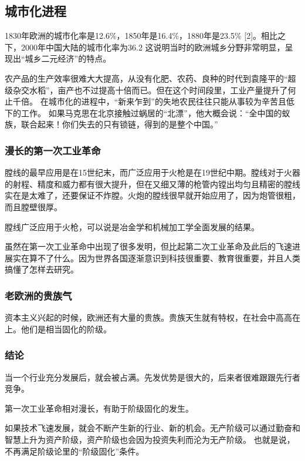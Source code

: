 \subsection{城市化进程}

1830年欧洲的城市化率是12.6\%，1850年是16.4\%，1880年是23.5\% [2]。相比之下，2000年中国大陆的城市化率为36.2%
这说明当时的欧洲城乡分野非常明显，呈现出“城乡二元经济”的特点。

农产品的生产效率很难大大提高，从没有化肥、农药、良种的时代到袁隆平的“超级杂交水稻”，亩产也不过提高十倍而已。但在这个时间段里，工业产量提升了何止千倍。
在城市化的进程中，“新来乍到”的失地农民往往只能从事较为辛苦且低下的工作。
如果马克思在北京接触过蜗居的“北漂”，他大概会说：“全中国的蚁族，联合起来！你们失去的只有锁链，得到的是整个中国。”

\subsubsection{漫长的第一次工业革命}

膛线的最早应用是在15世纪末，而广泛应用于火枪是在19世纪中期。膛线对于火器的射程、精度和威力都有很大提升，但在又细又薄的枪管内镗出均匀且精密的膛线实在是太难了，还要保证不炸膛。火炮的膛线很早就开始应用了，因为炮管很粗，而且膛壁很厚。

膛线广泛应用于火枪，可以说是冶金学和机械加工学全面发展的结果。

虽然在第一次工业革命中出现了很多发明，但比起第二次工业革命及此后的飞速进展实在算不了什么。因为世界各国逐渐意识到科技很重要、教育很重要，并且人类搞懂了怎样去研究。

\subsubsection{老欧洲的贵族气}
资本主义兴起的时候，欧洲还有大量的贵族。贵族天生就有特权，在社会中高高在上。他们是相当固化的阶级。

\subsubsection{结论}
当一个行业充分发展后，就会被占满。先发优势是很大的，后来者很难跟跟先行者竞争。

第一次工业革命相对漫长，有助于阶级固化的发生。

如果技术飞速发展，就会不断产生新的行业、新的机会。无产阶级可以通过勤奋和智慧上升为资产阶级，资产阶级也会因为投资失利而沦为无产阶级。
也就是说，不再满足阶级论里的“阶级固化”条件。

\zPar

